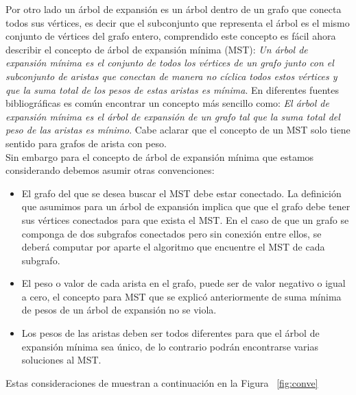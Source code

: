 \documentclass[letterpaper]{article}
\begin{document}
Por otro lado un árbol de expansión es un árbol dentro de un grafo que conecta todos sus vértices, es decir que el subconjunto que representa el árbol es el mismo conjunto de vértices del grafo entero, comprendido este concepto es fácil ahora describir el concepto de árbol de expansión mínima (MST): \textit{Un árbol de expansión mínima es el conjunto de todos los vértices de un grafo junto con el subconjunto de aristas que conectan de manera no cíclica todos estos vértices y que la suma total de los pesos de estas aristas es mínima}. En diferentes fuentes bibliográficas es común encontrar un concepto más sencillo como: \textit{El árbol de expansión mínima es el árbol de expansión de un grafo tal que la suma total del peso de las aristas es mínimo}. Cabe aclarar que el concepto de un MST solo tiene sentido para grafos de arista con peso.\\

Sin embargo para el concepto de árbol de expansión mínima que estamos considerando debemos asumir otras convenciones:

\begin{itemize}
\item El grafo del que se desea buscar el MST debe estar conectado. La definición que asumimos para un árbol de expansión implica que que el grafo debe tener sus vértices conectados para que exista el MST. En el caso de que un grafo se componga de dos subgrafos conectados pero sin conexión entre ellos, se deberá computar por aparte el algoritmo que encuentre el MST de cada subgrafo.
\item El peso o valor de cada arista en el grafo, puede ser de valor negativo o igual a cero, el concepto para MST que se explicó anteriormente de suma mínima de pesos de un árbol de expansión no se viola.
\item Los pesos de las aristas deben ser todos diferentes para que el árbol de expansión mínima sea único, de lo contrario podrán encontrarse varias soluciones al MST.
\end{itemize}

Estas consideraciones de muestran a continuación en la Figura ~\ref{fig:conve}
\end{document}
